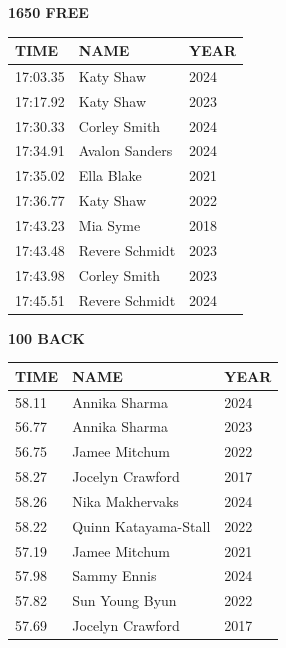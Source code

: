 \begin{table}[H]
\centering
\begin{minipage}[t]{0.48\textwidth}
\centering
\textbf{1650 FREE}\\[0.1cm]
\begin{tabular}{@{}p{1.8cm}p{2.8cm}p{1.2cm}@{}}
\hline
    \textbf{TIME} & \textbf{NAME} & \textbf{YEAR} \\
\hline
    17:03.35 & Katy Shaw & 2024 \\
    17:17.92 & Katy Shaw & 2023 \\
    17:30.33 & Corley Smith & 2024 \\
    17:34.91 & Avalon Sanders & 2024 \\
    17:35.02 & Ella Blake & 2021 \\
    17:36.77 & Katy Shaw & 2022 \\
    17:43.23 & Mia Syme & 2018 \\
    17:43.48 & Revere Schmidt & 2023 \\
    17:43.98 & Corley Smith & 2023 \\
    17:45.51 & Revere Schmidt & 2024 \\
\hline
\end{tabular}
\end{minipage}\hfill
\begin{minipage}[t]{0.48\textwidth}
\centering
\textbf{100 BACK}\\[0.1cm]
\begin{tabular}{@{}p{1.8cm}p{2.8cm}p{1.2cm}@{}}
\hline
    \textbf{TIME} & \textbf{NAME} & \textbf{YEAR} \\
\hline
    58.11 & Annika Sharma & 2024 \\
    56.77 & Annika Sharma & 2023 \\
    56.75 & Jamee Mitchum & 2022 \\
    58.27 & Jocelyn Crawford & 2017 \\
    58.26 & Nika Makhervaks & 2024 \\
    58.22 & Quinn Katayama-Stall & 2022 \\
    57.19 & Jamee Mitchum & 2021 \\
    57.98 & Sammy Ennis & 2024 \\
    57.82 & Sun Young Byun & 2022 \\
    57.69 & Jocelyn Crawford & 2017 \\
\hline
\end{tabular}
\end{minipage}
\end{table}

